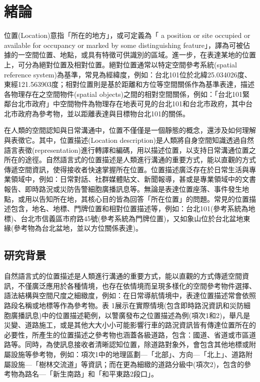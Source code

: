 
\chapter{緒論}

位置(Location)意指「所在的地方」\citep{RN171}，或可定義為「 a position or site occupied or available for occupancy or marked by some distinguishing feature」\citep{RN172}，譯為可被佔據的一空間位置、地點，或具有特徵可供識別的區域。進一步，在表達某地的位置上，可分為絕對位置及相對位置\citep{RN171}。絕對位置通常以特定空間參考系統(spatial reference system)為基準，常見為經緯度，例如：台北101位於北緯25.034026度、東經121.563903度\citep{RN174}；相對位置則是基於距離和方位等空間關係作為基準表達，描述各物理存在之空間物件(spatial objects)之間的相對空間關係，例如：「台北101緊鄰台北市政府」中空間物件為物理存在地表可見的台北101和台北市政府，其中台北市政府為參考物，並以距離表達與目標物台北101的關係。

在人類的空間認知與日常溝通中，位置不僅僅是一個靜態的概念，還涉及如何理解與表徵它。其中，位置描述(Location description)是人類將自身空間知識透過自然語言表徵(representation)進行轉譯和編碼，用以描述位置，以支持日常溝通位置之所在的途徑\citep{RN23, RN93, RN126, RN128}。自然語言式的位置描述是人類進行溝通的重要方式，能以直觀的方式傳遞空間資訊，使得接收者快速掌握所在位置。位置描述廣泛存在於日常生活與專業領域中，例如：日常對話、社群媒體貼文、新聞報導，甚或是專業領域中的文書報告、即時路況或災防告警細胞廣播訊息等。無論是表達位置座落、事件發生地點，或用以告知所在地，其核心目的皆為回答「所在位置」的問題。常見的位置描述包含，地名、地標、門牌位置和相對位置描述等，例如：台北101(參考系統為地標)、台北市信義區市府路45號(參考系統為門牌位置)，又如象山位於台北盆地東緣(參考物為台北盆地，並以方位關係表達)。

\section{研究背景}

自然語言式的位置描述是人類進行溝通的重要方式，能以直觀的方式傳遞空間資訊，不僅廣泛應用於各種情境，也存在依情境而呈現多樣化的空間參考物件選擇、語法結構與空間尺度之細緻度，例如：在日常導航情境中，表達位置描述常會依照路段名稱或地標等作為參考物。表 1展示在實際情境(包含即時路況資訊和災防細胞廣播訊息)中的位置描述範例，以警廣發布之位置描述為例(項次1和2)，舉凡是災變、道路施工，或是其他大大小小可能影響行車的路況資訊皆有傳達位置所在的必要性，所產生的位置描述之參考物也涵蓋各級道路，包含：國道、省道或市區道路等。同時，為使訊息接收者清晰認知位置，除道路對象外，會包含其他地標或附屬設施等參考物，例如：項次1中的地理區劃—「北部」、方向—「北上」、道路附屬設施—「樹林交流道」等資訊；而在更為細緻的道路分級中(項次2)，包含的參考物為路名—「新生南路」和「和平東路2段口」。

